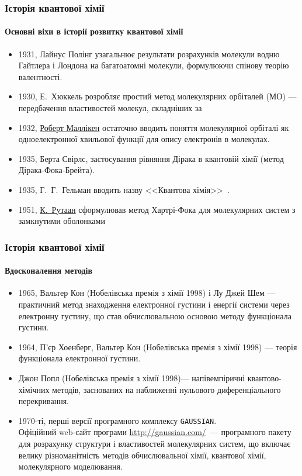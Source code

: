\documentclass[10pt]{beamer}
\begin{document}
\begin{frame}
	\frametitle{Історія квантової хімії}
	\framesubtitle{Основні віхи в історії розвитку квантової хімії}
	\begin{itemize}
		\item 1931, Лайнус Полінг узагальнює результати розрахунків молекули водню Гайтлера і Лондона на багатоатомні молекули, формулюючи спінову теорію валентності.
		\item 1930, Е.~Хюккель розробляє простий метод молекулярних орбіталей (МО) --- передбачення властивостей молекул, складніших за 
		\item 1932, \href{https://en.wikipedia.org/wiki/Robert_S._Mulliken}{Роберт Маллікен} остаточно вводить поняття молекулярної орбіталі як одноелектронної хвильової функції для опису електронів в молекулах.
		\item 1935, Берта Свірлс, застосування рівняння Дірака в квантовій хімії (метод Дірака-Фока-Брейта).
		\item 1935, Г.~Г.~Гельман вводить назву <<Квантова хімія>>~\cite{Gelman}.
		\item 1951, \href{https://en.wikipedia.org/wiki/Clemens_C._J._Roothaan}{К.~Рутаан} сформулював метод Хартрі-Фока для молекулярних систем з замкнутими оболонками
	\end{itemize}
\end{frame}

\begin{frame}
	\frametitle{Історія квантової хімії}
	\framesubtitle{Вдосконалення методів}
	\begin{itemize}
		\item  1965, Вальтер Кон (Нобелівська премія з хімії 1998) і Лу Джей Шем  --- практичний метод знаходження електронної густини і енергії системи через електронну густину, що став обчислювальною основою методу функціонала густини.
		\item 1964, П'єр Хоенберг, Вальтер Кон (Нобелівська премія з хімії 1998) ---  теорія функціонала електронної густини.
		\item Джон Попл (Нобелівська премія з хімії 1998)--- напівемпіричні квантово-хімічних методів, заснованих на наближенні нульового диференціального перекривання.
		\item 1970-ті,  перші версії програмного комплексу \texttt{GAUSSIAN}.\\ {\scriptsize Офіційний web-сайт програми \url{http://gaussian.com/}~--- програмного пакету для розрахунку структури і властивостей молекулярних систем, що включає велику різноманітність методів обчислювальної хімії, квантової хімії, молекулярного моделювання.}
	\end{itemize}
\end{frame}
\end{document}
